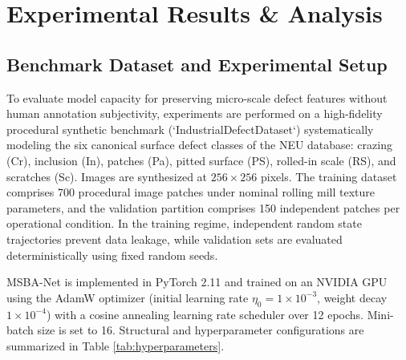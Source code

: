 \documentclass{ieeeaccess}
\begin{document}
\section{Experimental Results \& Analysis}
\label{sec:experimental_results}

\subsection{Benchmark Dataset and Experimental Setup}
\label{sec:dataset_protocol}
To evaluate model capacity for preserving micro-scale defect features without human annotation subjectivity, experiments are performed on a high-fidelity procedural synthetic benchmark (`IndustrialDefectDataset`) systematically modeling the six canonical surface defect classes of the NEU database: crazing (Cr), inclusion (In), patches (Pa), pitted surface (PS), rolled-in scale (RS), and scratches (Sc). Images are synthesized at $256 \times 256$ pixels. The training dataset comprises 700 procedural image patches under nominal rolling mill texture parameters, and the validation partition comprises 150 independent patches per operational condition. In the training regime, independent random state trajectories prevent data leakage, while validation sets are evaluated deterministically using fixed random seeds.

MSBA-Net is implemented in PyTorch 2.11 and trained on an NVIDIA GPU using the AdamW optimizer (initial learning rate $\eta_0 = 1 \times 10^{-3}$, weight decay $1 \times 10^{-4}$) with a cosine annealing learning rate scheduler over 12 epochs. Mini-batch size is set to 16. Structural and hyperparameter configurations are summarized in Table \ref{tab:hyperparameters}.
\end{document}
